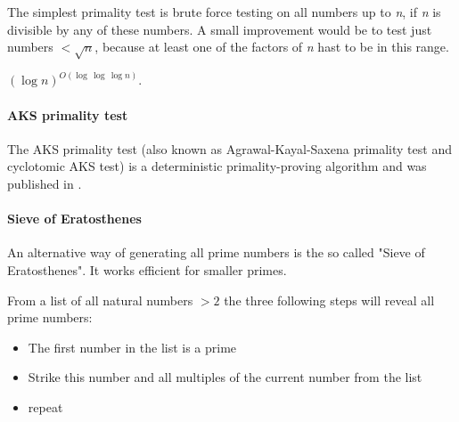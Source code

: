The simplest primality test is brute force testing on all numbers up to \emph{n}, if \emph{n} is divisible by any of these numbers. A small improvement would be to  test just numbers $< \sqrt{n}$, because at least one of the factors of \emph{n} hast to be in this range.

    $(\log n)^{O(\log\,\log \,\log n)}$. 

\paragraph{AKS primality test}
The AKS primality test (also known as Agrawal-Kayal-Saxena primality test and cyclotomic AKS test) is a deterministic primality-proving algorithm and was published in \cite{primeisp}.


\paragraph{Sieve of Eratosthenes}
An alternative way of generating all prime numbers is the so called "Sieve of Eratosthenes". It works efficient for smaller primes.

From a list of all natural numbers $> 2$ the three following steps will reveal all prime numbers:

\begin{itemize}%
   \item The first number in the list is a prime
   \item Strike this number and all multiples of the current number from the list
   \item repeat  
\end{itemize}%

